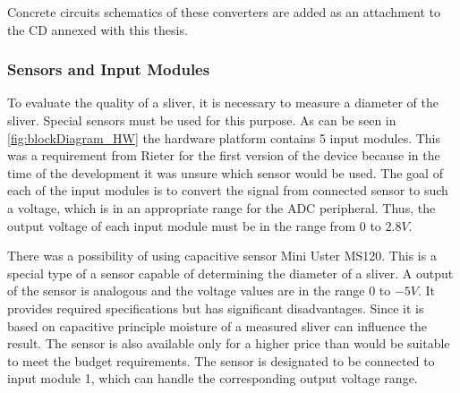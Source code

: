 \documentclass[twoside]{ctuthesis}
\theoremstyle{plain}
\theoremstyle{definition}
\theoremstyle{note}
\begin{document}
Concrete circuits schematics of these converters are added as an attachment to the CD annexed with this thesis.

\subsubsection{Sensors and Input Modules}
\label{sec:Sensors}
To evaluate the quality of a sliver, it is necessary to measure a diameter of the sliver. Special sensors must be used for this purpose. 
As can be seen in \ref{fig:blockDiagram_HW} the hardware platform contains 5 input modules. This was a requirement from Rieter for the first version of the device because in the time of the development it was unsure which sensor would be used. The goal of each of the input modules is to convert the signal from connected sensor to such a voltage, which is in an appropriate range for the ADC peripheral. Thus, the output voltage of each input module must be in the range from $0$ to $2.8V$.

There was a possibility of using capacitive sensor Mini Uster MS120. This is a special type of a sensor capable of determining the diameter of a sliver. A output of the sensor is analogous and the voltage values are in the range $0$ to $-5V$. It provides required specifications but has significant disadvantages. Since it is based on capacitive principle moisture of a measured sliver can influence the result. The sensor is also available only for a higher price than would be suitable to meet the budget requirements. The sensor is designated to be connected to input module 1, which can handle the corresponding output voltage range.
\end{document}
